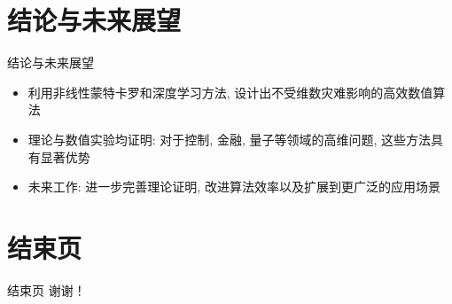 \documentclass[aspectratio=169]{beamer}
\begin{document}
	\section{结论与未来展望}
	\begin{frame}{结论与未来展望}
		\begin{itemize}
			\item 利用非线性蒙特卡罗和深度学习方法, 设计出不受维数灾难影响的高效数值算法
			\item 理论与数值实验均证明: 对于控制, 金融, 量子等领域的高维问题, 这些方法具有显著优势
			\item 未来工作: 进一步完善理论证明, 改进算法效率以及扩展到更广泛的应用场景
		\end{itemize}
	\end{frame}

	\section{结束页}
	\begin{frame}{结束页}
		\centering \Huge 谢谢！
	\end{frame}
\end{document}
